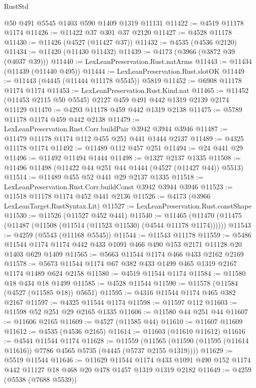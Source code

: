 \begin{lexlean}{RustStd}
\begin{coremodule}
    @50
    @491
    @5545
    @1403
    @590
    @1409
    @1319
    @11131
@11422 := @4519 @11178 @1174
@11426 := @11422 @37 @301 @37 @2120
@11427 := @4528 @11178
@11430 := @11426 (@4527 (@11427 @37))
@11432 := @4535 (@4536 @2120)
@11434 := @11420 (@11430 @11432)
@11439 := @4173 (@3966 (@3872 @39 (@4037 @39)))
@11440 := LexLeanPreservation.Rust.natArms
@11443 := @11434 (@11439 (@11440 @495))
@11444 := LexLeanPreservation.Rust.slotOK
@11449 := @11443 (@4445 (@11444 @11178 @5545)) @5819
@11452 := @6908 @11178 @1174 @1174
@11453 := LexLeanPreservation.Rust.Kind.nat
@11465 := @11452 (@11453 @2115 @50 @5545) @2127 @459 @491 @442 @1319 @2139 @2174 @11129
@11470 := @4293 @11178 @459 @442 @1319 @2138
@11475 := @5789 @11178 @1174 @459 @442 @2138
@11479 := LexLeanPreservation.Rust.Corr.buildPair @3942 @3944 @3946
@11487 := @11479 @11178 @1174 @112 @455 @251 @441 @1444 @2137
@11489 := @4325 @11178 @1174
@11492 := @11489 @112 @457 @251
@11494 := @24 @441 @29
@11496 := @11492 @11494 @1444
@11498 := @1327 @2137 @1335
@11508 := @11496 @11498 (@11422 @44 @251 @44 @1444 (@4527 (@11427 @44)) @5513)
@11514 := @11489 @455 @52 @441 @29 @2137 @1335
@11518 := LexLeanPreservation.Rust.Corr.buildConst @3942 @3944 @3946
@11523 := @11518 @11178 @1174 @452 @441 @2136
@11526 := @4173 (@3966 LexLeanTarget.RustSyntax.Lit)
@11527 := LexLeanPreservation.Rust.constShape
@11530 := @11526 (@11527 @452 @441)
@11540 := @11465 (@11470 (@11475 (@11487 (@11508 (@11514 (@11523 @11530) (@4544 @11178 @1174))))))
@11543 := @4259 (@5543 (@11168 @5545))
@11544 := @11543 @11178
@11559 := @5486 @11544 @1174 @1174 @442 @433 @1091 @466 @490 @153 @2171 @11128 @20 @1403 @629 @1409
@11565 := @5663 @11544 @1174 @466 @433 @2162 @2169
@11578 := @5673 @11544 @1174 @67 @382 @433 @1499 @465 @1319 @2167 @1174 @1489 @624 @2158
@11580 := @4519 @11544 @1174
@11584 := @11580 @18 @434 @18 @1499
@11585 := @4528 @11544
@11590 := @11578 (@11584 (@4527 (@11585 @18)) @5651)
@11595 := @4316 @11544 @1174 @465 @382 @2167
@11597 := @4325 @11544 @1174
@11598 := @11597 @112
@11603 := @11598 @52 @251 @29 @2165 @1335
@11606 := @11580 @44 @251 @44
@11607 := @11606 @2165
@11609 := @4527 (@11585 @44)
@11610 := @11607 @11609
@11612 := @4535 (@4536 @2165)
@11614 := @11603 (@11610 @11612)
@11616 := @4544 @11544 @1174
@11628 := @11559
    (@11565 (@11590 (@11595 (@11614 @11616)) @7786 @4565 @5735 (@4445 (@5737 @2155 @1319))))
@11629 := @5519 @11544
@11646 := @11629
    @11544
    @1174
    @433
    @1091
    @490
    @152
    @1174
    @442
    @11127
    @18
    @468
    @20
    @478
    @1457
    @1319
    @1319
    @2182
@11649 := @4259 (@5538 (@7688 @5539))

\end{coremodule}
\end{lexlean}
